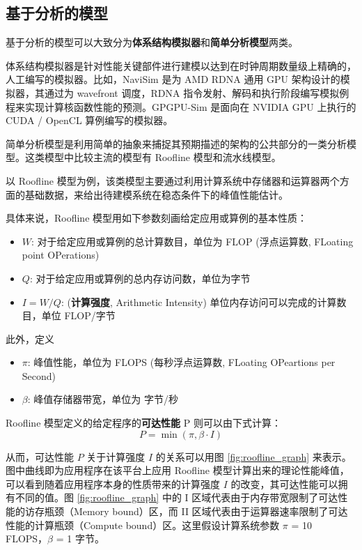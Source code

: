 \subsection{基于分析的模型}

基于分析的模型可以大致分为\textbf{体系结构模拟器}和\textbf{简单分析模型}两类。

体系结构模拟器是针对性能关键部件进行建模以达到在时钟周期数量级上精确的，人工编写的模拟器。比如，NaviSim \cite{10.1145/3559009.3569666} 是为 AMD RDNA 通用 GPU 架构设计的模拟器，其通过为 wavefront 调度，RDNA 指令发射、解码和执行阶段编写模拟例程来实现计算核函数性能的预测。GPGPU-Sim \cite{9138922, 4919648} 是面向在 NVIDIA GPU 上执行的 CUDA / OpenCL 算例编写的模拟器。

简单分析模型是利用简单的抽象来捕捉其预期描述的架构的公共部分的一类分析模型。这类模型中比较主流的模型有 Roofline 模型\cite{10.1145/1498765.1498785, KONSTANTINIDIS201737}和流水线模型\cite{LEMEIRE202332, 10289219, 10.1145/3524059.3532396}。 

以 Roofline 模型为例，该类模型主要通过利用计算系统中存储器和运算器两个方面的基础数据，来给出待建模系统在稳态条件下的峰值性能估计。

具体来说，Roofline 模型用如下参数刻画给定应用或算例的基本性质：

\begin{itemize}
    \item $W$: 对于给定应用或算例的总计算数目，单位为 FLOP (浮点运算数, FLoating point OPerations)
    \item $Q$: 对于给定应用或算例的总内存访问数，单位为字节
    \item $I = W/Q$: (\textbf{计算强度}, Arithmetic Intensity) 单位内存访问可以完成的计算数目，单位 FLOP/字节
\end{itemize}

此外，定义

\begin{itemize}
    \item $\pi$: 峰值性能，单位为 FLOPS (每秒浮点运算数, FLoating OPeartions per Second)
    \item $\beta$: 峰值存储器带宽，单位为 字节/秒
\end{itemize}

Roofline 模型定义的给定程序的\textbf{可达性能} P 则可以由下式计算：
$$
P = \min(\pi, \beta \cdot I)
$$

从而，可达性能 $ P $ 关于计算强度 $ I $ 的关系可以用图 \ref{fig:roofline_graph} 来表示。图中曲线即为应用程序在该平台上应用 Roofline 模型计算出来的理论性能峰值，可以看到随着应用程序本身的性质带来的计算强度 $ I $ 的改变，其可达性能可以拥有不同的值。图 \ref{fig:roofline_graph} 中的 I 区域代表由于内存带宽限制了可达性能的访存瓶颈（Memory bound）区，而 II 区域代表由于运算器速率限制了可达性能的计算瓶颈（Compute bound）区。这里假设计算系统参数 $\pi$ = 10 FLOPS，$\beta$ = 1 字节。


